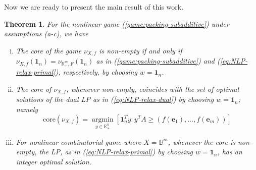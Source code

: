 \documentclass[11pt]{article}\usepackage[]{graphicx}\usepackage[]{xcolor}
\newtheorem{thm}{Theorem}
\DeclareMathOperator*{\argmin}{argmin}
\begin{document}
Now we are ready to present the main result of this work. 
\begin{thm}\label{thm:nonlinear-packing-game}
For the nonlinear game (\ref{game:packing-subadditive}) under assumptions (a-c), we have
\begin{enumerate}[(i)]
\item The core of the game $\nu_{X, f}$ is non-empty if and only if $\nu_{X, f}\left(\mathbf{1}_n\right)=\nu_{\mathbb{R}^m_{+}, F}\left(\mathbf{1}_n\right)$ as in (\ref{game:packing-subadditive}) and (\ref{eq:NLP-relax-primal}), respectively, by choosing $w=\mathbf{1}_n$.
\item The core of $\nu_{X, f}$, whenever non-empty, coincides with the set of optimal solutions of the dual LP as in (\ref{eq:NLP-relax-dual}) by choosing $w=\mathbf{1}_n$; namely
 \[
 \text{core} \left(\nu_{X, f}\right)=\argmin\limits_{y\in \mathbb{R}^n_{+}} \left[\mathbf{1}_n^Ty: y^TA\ge (f(\mathbf{e}_1),\dots, f(\mathbf{e}_m))\right]
 \]
\item For nonlinear combinatorial game where $X=\mathbb{B}^m$, whenever the core is non-empty, the LP, as in (\ref{eq:NLP-relax-primal}) by choosing $w=\mathbf{1}_n$, has an integer optimal solution. 
\end{enumerate}
\end{thm}
\end{document}
